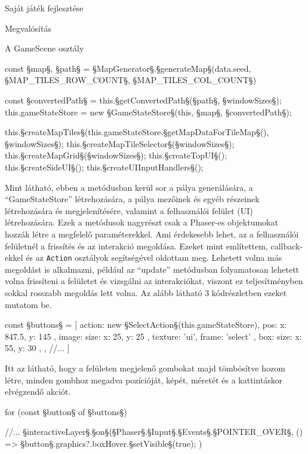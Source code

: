 \begin{MyChapter}{Saját játék fejlesztése}
\begin{MySection}{Megvalósítás}
\begin{MySubSection}{A GameScene osztály}
\begin{javascript}
{	const {§\color{jsConst}map§, §\color{jsConst}path§} = §\color{jsConst}MapGenerator§.§\color{jsMethod}generateMap§(data.seed, §\color{jsConst}MAP\_TILES\_ROW\_COUNT§, §\color{jsConst}MAP\_TILES\_COL\_COUNT§)
	
	const §\color{jsConst}convertedPath§ = this.§\color{jsMethod}getConvertedPath§(§\color{jsConst}path§, §\color{jsConst}windowSizes§);
	this.gameStateStore = new §\color{jsType}GameStateStore§(this, §\color{jsConst}map§, §\color{jsConst}convertedPath§);
	
	this.§\color{jsMethod}createMapTiles§(this.gameStateStore.§\color{jsMethod}getMapDataForTileMap§(), §\color{jsConst}windowSizes§);
	this.§\color{jsMethod}createMapTileSelector§(§\color{jsConst}windowSizes§);
	this.§\color{jsMethod}createMapGrid§(§\color{jsConst}windowSizes§);
	this.§\color{jsMethod}createTopUI§();
	this.§\color{jsMethod}createSideUI§();
	this.§\color{jsMethod}createUIInputHandlers§();
} 
			\end{javascript}
			Mint látható, ebben a metódusban kerül sor a pálya generálására, a ``GameStateStore'' létrehozására, a pálya mezőinek és egyéb részeinek létrehozására és megjelenítésére, valamint a felhasználói felület (UI) létrehozására. Ezek a metódusok nagyrészt csak a Phaser-es objektumokat hozzák létre a megfelelő paraméterekkel. Ami érdekesebb lehet, az a felhasználói felületnél a frissítés és az interakció megoldása. Ezeket mint említettem, callback-ekkel és az \texttt{Action} osztályok segítségével oldottam meg. Lehetett volna más megoldást is alkalmazni, például az ``update'' metódusban folyamatosan lehetett volna frissíteni a felületet és vizsgálni az interakciókat, viszont ez teljesítményben sokkal rosszabb megoldás lett volna. Az alább látható 3 kódrészletben ezeket mutatom be.
			\begin{javascript}
const §\color{jsConst}buttons§ = [
	{
		action: new §\color{jsType}SelectAction§(this.gameStateStore),
		pos: { x: 847.5, y: 145 },
		image: { size: { x: 25, y: 25 }, texture: 'ui', frame: 'select' },
		box: { size: { x: 55, y: 30 }},
	},
	//...
]
			\end{javascript}
			Itt az látható, hogy a felületen megjelenő gombokat majd tömbösítve hozom létre, minden gombhoz megadva pozícióját, képét, méretét és a kattintáskor elvégzendő akciót.
			\begin{javascript}
for (const §\color{jsConst}button§ of §\color{jsConst}buttons§) {
	//...
	§\color{jsConst}interactiveLayer§.§\color{jsMethod}on§(§\color{jsType}Phaser§.§\color{jsType}Input§.§\color{jsType}Events§.§\color{jsConst}POINTER\_OVER§, () => {
		§\color{jsConst}button§.graphics?.boxHover.§\color{jsMethod}setVisible§(true);
	})
	
}
\end{javascript}
\end{MySubSection}
\end{MySection}
\end{MyChapter}
